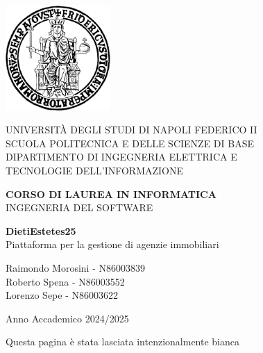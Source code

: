 \documentclass[a4paper,12pt]{report}
\newcommand{\NomeProgetto}{DietiEstetes25}
\begin{document}
\begin{titlepage}
    \centering
    \includegraphics[width=0.3\textwidth]{Immagini/logo_universita.png} %
    
    \vspace{1cm}
    
    {\LARGE UNIVERSITÀ DEGLI STUDI DI NAPOLI FEDERICO II \\}
    \vspace{0.3cm}
    {\Large SCUOLA POLITECNICA E DELLE SCIENZE DI BASE \\}
    \vspace{0.3cm}
    {\Large DIPARTIMENTO DI INGEGNERIA ELETTRICA E \\ TECNOLOGIE DELL'INFORMAZIONE \\}
    
    \vspace{1.5cm}
    
    {\Large \textbf{CORSO DI LAUREA IN INFORMATICA \\}}
    \vspace{0.3cm}
    {\Large INGEGNERIA DEL SOFTWARE \\}
    
    \vspace{1.5cm}
    
    {\Huge \textbf{\NomeProgetto} \\}
    \vspace{0.5cm}
    {\Large Piattaforma per la gestione di agenzie immobiliari \\}
    
    \vfill
    
    {\large Raimondo Morosini - N86003839 \\}
    {\large Roberto Spena - N86003552 \\}
    {\large Lorenzo Sepe - N86003622 \\}
    
    \vspace{1.5cm}
    
    {\large Anno Accademico 2024/2025 \\}\newpage
\end{titlepage}
\newpage
Questa pagina è stata lasciata intenzionalmente bianca
\end{document}

